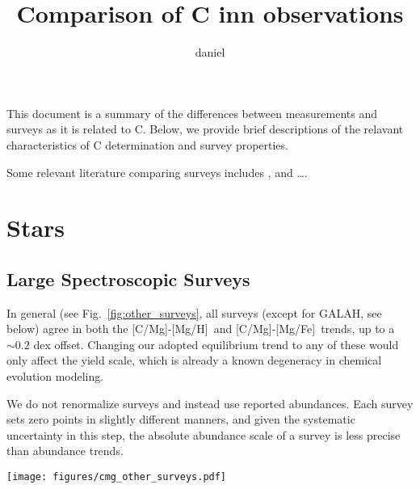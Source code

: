 \documentclass[11pt]{article}
\title{Comparison of C inn observations}
\author{daniel}
\newcommand{\caah}{[C/Mg]-[Mg/H]}
\newcommand{\caafe}{[C/Mg]-[Mg/Fe]}
\newcommand{\about}[1]{${\sim} #1$}
\begin{document}
\maketitle



This document is a summary of the differences between measurements and surveys as it is related to C. Below, we provide brief descriptions of the relavant characteristics of C determination and survey properties.

Some relevant literature comparing surveys includes \citet{hegedhus+2023}, and \dots.

\section{Stars}

\subsection{Large Spectroscopic Surveys}
In general (see Fig.~\ref{fig:other_surveys}, all surveys (except for GALAH, see below) agree in both the \caah\ and \caafe\ trends, up to a \about{0.2} dex offset. Changing our adopted equilibrium trend to any of these would only affect the yield scale, which is already a known degeneracy in chemical evolution modeling. 


We do not renormalize surveys and instead use reported abundances. Each survey sets zero points in slightly different manners, and given the systematic uncertainty in this step, the absolute abundance scale of a survey is less precise than abundance trends.




\begin{figure*}
    \centering
    \texttt{[image: figures/cmg\_other\_surveys.pdf]}
    \caption{Binned median trends for several surveys.
    With the exception of GALAH (see text), all samples agree up to a normalization for \caah\, and, even more encouragingly, samples approximately trace out the same trend in \caafe.}
    \label{fig:other_surveys}
\end{figure*}
\end{document}
